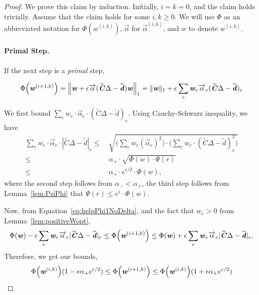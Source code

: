 \documentclass[11pt]{article}
\renewcommand{\norm}[1]{\ensuremath{\left\lVert #1 \right\rVert}}
\let\originalleft\left
\let\originalright\right
\renewcommand{\left}{\mathopen{}\mathclose\bgroup\originalleft}
\renewcommand{\right}{\aftergroup\egroup\originalright}
\newcommand\dd{\boldsymbol{\mathit{d}}}
\newcommand\rr{\boldsymbol{\mathit{r}}}
\newcommand\ww{\boldsymbol{\mathit{w}}}
\newcommand\CC{\boldsymbol{\mathit{C}}}
\newcommand{\wt}{\widetilde}
\begin{document}
\begin{proof}
  We prove this claim by induction. Initially, $i = k = 0$, and the claim holds trivially. Assume that the claim holds for some $i,k \ge 0.$
We will use $\Phi$ as an abbreviated notation for $\Phi(\ww^{(i,k)})$, $\overrightarrow{\alpha}$ for $\overrightarrow{\alpha}^{(i,k)} $, and $\ww$ to denote $\ww^{(i,k)}$.
\paragraph*{Primal Step.} If the next step is a \emph{primal} step, 

\begin{equation}\label{eq:helpPhi1NoDelta}
\Phi\left(\ww^{( i+1,k)} \right) = \norm{ \ww+ \epsilon \overrightarrow{\alpha} (\wt{\CC}\Delta-\wt{\dd})\ww}_1 = \|\ww\|_1 + \epsilon \sum_e \ww_e \overrightarrow{\alpha}_e (\wt{\CC}\Delta-\wt{\dd})_e
\end{equation}

We first bound $\sum_e \ww_e \cdot \overrightarrow{\alpha}_e \cdot (\wt{\CC}\Delta-\wt{\dd})_e$. Using Cauchy-Schwarz inequality, we have
\begin{align*}
\sum_e \ww_e \cdot \overrightarrow{\alpha}_e \cdot |\wt{\CC}\Delta-\wt{\dd}|_e \leq &~ \sqrt{\Big(\sum_e \ww_e (\overrightarrow{\alpha}_e)^2\Big) \cdot \Big(\sum_e \ww_e \cdot (\wt{\CC}\Delta-\wt{\dd})_e^2\Big)} \\
\leq &~ \alpha_+ \cdot \sqrt{\Phi(\ww) \cdot \Psi(\rr)} \\
\leq &~ \alpha_+ \cdot e^{\epsilon/2} \cdot \Phi(\ww),
\end{align*}
where the second step follows from $\alpha_- < \alpha _+$, the third step follows from Lemma~\ref{lem:PsiPhi} that $\Psi(\rr) \leq e^{\epsilon} \cdot \Phi(\ww)$.

Now, from Equation~\eqref{eq:helpPhi1NoDelta}, and the fact that $\ww_e > 0$ from Lemma~\ref{lem:positiveWopt},
\[
\Phi(\ww) - \epsilon \sum_e \ww_e \overrightarrow{\alpha}_e |\wt{\CC}\Delta-\wt{\dd}|_e \leq \Phi\left(\ww^{( i+1,k)} \right)  \leq \Phi(\ww) + \epsilon \sum_e \ww_e \overrightarrow{\alpha}_e |\wt{\CC}\Delta-\wt{\dd}|_e. 
\]
Therefore, we get our bounds,
\[
\Phi\left(\ww^{( i,k)} \right)(1-\epsilon\alpha_+e^{\epsilon/2}) \leq  \Phi\left(\ww^{( i+1,k)} \right) \leq  \Phi\left(\ww^{( i,k)} \right)(1+\epsilon\alpha_+e^{\epsilon/2}) 
\]


\end{proof}
\end{document}
